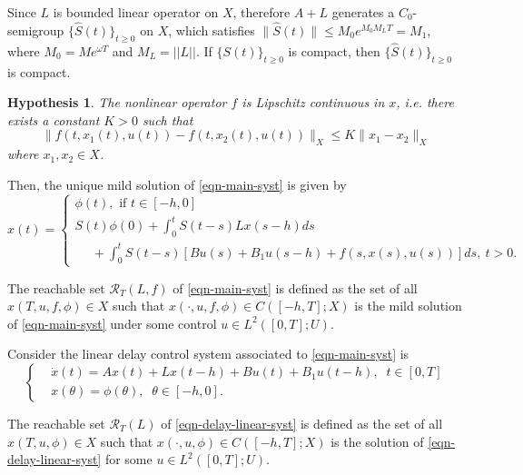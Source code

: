 \documentclass[12pt]{llncs}
\newtheorem{hp}{Hypothesis}
\begin{document}
Since $L$ is bounded linear operator on $X$, therefore $A+L$ generates a $C_0$-semigroup $\{\hat{S}(t)\}_{t\ge 0}$ on $X$, which satisfies $ \| \hat{S}(t) \| \leq M_0 e^{M_0M_LT} = M_1 $, where $ M_0=Me^{\omega T} $ and $M_L = ||L||$. If $\{S(t)\}_{t\ge 0}$ is compact, then $\{\hat{S}(t)\}_{t\ge 0}$ is compact. 

\begin{hp}\label{f1}
	The nonlinear operator $f$ is Lipschitz continuous in $x$, i.e. there exists a constant $K>0$ such that
	\begin{equation*}
		\| f(t,x_1(t),u(t))-f(t,x_2(t),u(t)) \|_X \leq K \| x_1-x_2 \|_X
	\end{equation*}
	where $x_1, x_2 \in X$.
\end{hp}
Then, the unique mild solution of \eqref{eqn-main-syst} is given by
\begin{equation}\label{eqn-main-soln}
	x(t) = \begin{cases}
		\phi(t), \mbox{ if } t \in [-h,0] \\
		S(t)\phi(0) + \int_{0}^{t} S(t-s) L x(s-h) ds \\ ~~~~~~ + \int_{0}^{t} S(t-s)[B u(s) + B_1 u(s-h) + f(s,x(s),u(s))] ds, ~ t > 0.
	\end{cases}
\end{equation}

\begin{definition}
The reachable set $\mathcal{R}_T(L,f)$ of \eqref{eqn-main-syst} is defined as the set of all $x(T,u,f,\phi) \in X$ such that $x(\cdot,u,f,\phi) \in C ( [-h, T];X )$ is the mild solution of \eqref{eqn-main-syst} under some control $u \in L^{2}([0,T]; U)$.
\end{definition}
Consider the linear delay control system associated to \eqref{eqn-main-syst} is
\begin{equation}\label{eqn-delay-linear-syst}
	\left\{
	\begin{aligned}
		& \dot{x}(t)=Ax(t)+Lx(t-h)+B u(t)+B_1 u(t-h), \;\;t \in[0,T]  \\
		& x(\theta)=\phi(\theta), \;\; \theta \in [-h,0].
	\end{aligned}
	\right.	
\end{equation}

\begin{definition}
The reachable set $\mathcal{R}_T(L)$ of \eqref{eqn-delay-linear-syst} is defined as the set of all $x(T,u, \phi) \in X$ such that $x(\cdot,u,\phi) \in C ( [-h,T];X )$ is the solution of \eqref{eqn-delay-linear-syst} for some $u \in L^{2}([0,T]; U)$.
\end{definition}
\end{document}
